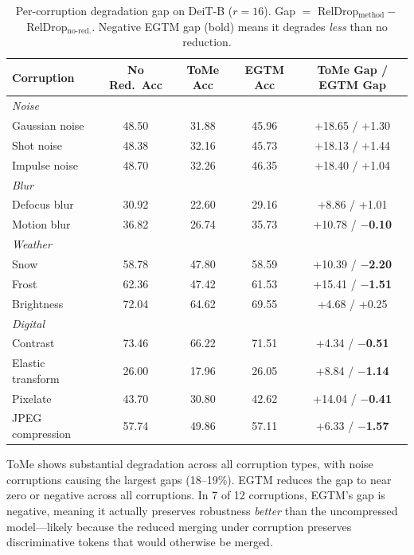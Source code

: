 \documentclass{article}
\newcommand{\ours}{EGTM}
\begin{document}
\begin{table}[t]
\caption{Per-corruption degradation gap on DeiT-B ($r{=}16$). Gap $=$ RelDrop$_{\text{method}} -$ RelDrop$_{\text{no-red.}}$. Negative \ours{} gap (bold) means it degrades \emph{less} than no reduction.}
\label{tab:per_corruption_b}
\centering
\small
\begin{tabular}{lcccc}
\toprule
Corruption & No Red.\ Acc & ToMe Acc & \ours{} Acc & ToMe Gap / \ours{} Gap \\
\midrule
\multicolumn{5}{l}{\textit{Noise}} \\
Gaussian noise      & 48.50 & 31.88 & 45.96 & +18.65 / +1.30 \\
Shot noise          & 48.38 & 32.16 & 45.73 & +18.13 / +1.44 \\
Impulse noise       & 48.70 & 32.26 & 46.35 & +18.40 / +1.04 \\
\midrule
\multicolumn{5}{l}{\textit{Blur}} \\
Defocus blur        & 30.92 & 22.60 & 29.16 & +8.86 / +1.01 \\
Motion blur         & 36.82 & 26.74 & 35.73 & +10.78 / \textbf{$-$0.10} \\
\midrule
\multicolumn{5}{l}{\textit{Weather}} \\
Snow                & 58.78 & 47.80 & 58.59 & +10.39 / \textbf{$-$2.20} \\
Frost               & 62.36 & 47.42 & 61.53 & +15.41 / \textbf{$-$1.51} \\
Brightness          & 72.04 & 64.62 & 69.55 & +4.68 / +0.25 \\
\midrule
\multicolumn{5}{l}{\textit{Digital}} \\
Contrast            & 73.46 & 66.22 & 71.51 & +4.34 / \textbf{$-$0.51} \\
Elastic transform   & 26.00 & 17.96 & 26.05 & +8.84 / \textbf{$-$1.14} \\
Pixelate            & 43.70 & 30.80 & 42.62 & +14.04 / \textbf{$-$0.41} \\
JPEG compression    & 57.74 & 49.86 & 57.11 & +6.33 / \textbf{$-$1.57} \\
\bottomrule
\end{tabular}
\end{table}

ToMe shows substantial degradation across all corruption types, with noise corruptions causing the largest gaps (18--19\%). \ours{} reduces the gap to near zero or negative across all corruptions. In 7 of 12 corruptions, \ours{}'s gap is negative, meaning it actually preserves robustness \emph{better} than the uncompressed model---likely because the reduced merging under corruption preserves discriminative tokens that would otherwise be merged.
\end{document}
